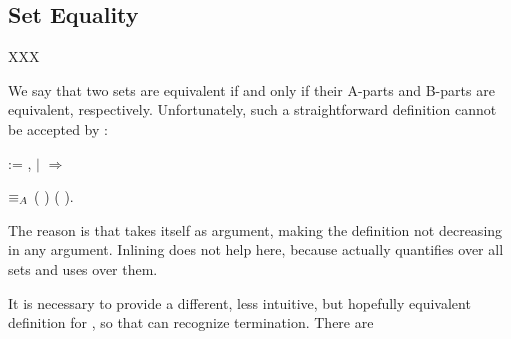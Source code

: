 \subsection{Set Equality}

XXX

We say that two \NFO{} sets are equivalent if and only if their A-parts and B-parts are equivalent, respectively. Unfortunately, such a straightforward definition cannot be accepted by \Coq:

\begin{coqdoccode}
  \coqdocemptyline
\coqdocnoindent
\sout{}    :=  ,  \coqdoceol
\coqdocindent{2.00em}
\ensuremath{|}             \ensuremath{\Rightarrow} \coqdoceol

\coqdocindent{4.00em}  $\equiv_A$  %
% 
    (  ) (  ).\coqdoceol
 \coqdocemptyline
\end{coqdoccode}

The reason is that  takes  itself as argument, making the definition not decreasing in any argument. Inlining  does not help here, because  actually quantifies over all sets and uses  over them.

It is necessary to provide a different, less intuitive, but hopefully equivalent definition for , so that \Coq{} can recognize termination. There are 

